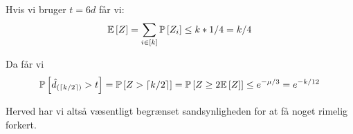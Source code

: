 Hvis vi bruger $t = 6d$ får vi:
$$
  \E{Z} = \sum_{i \in [k]} \P{Z_i} \leq k * 1/4 = k/4
$$

Da får vi
\begin{align}
  \P{\hat d_{(\ceil{k/2})} > t}
  = \P{Z > \ceil{k/2}}
  = \P{Z \geq 2 \E{Z}}
  \leq e^{- \mu / 3}
  = e^{- k / 12}
\end{align}

Herved har vi altså væsentligt begrænset sandsynligheden for at få noget rimelig forkert.










